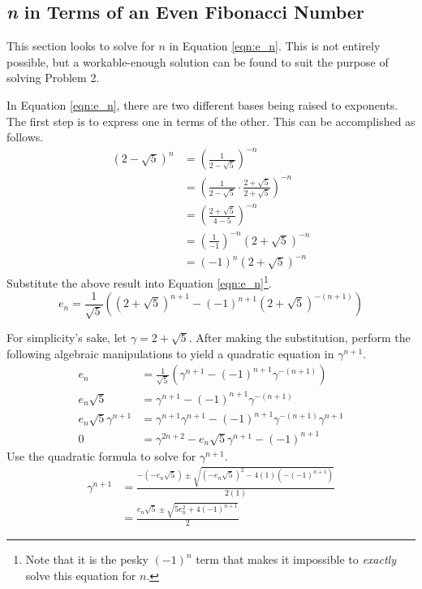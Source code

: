 \documentclass[titlepage]{article}
\begin{document}
\subsection{\emph{n} in Terms of an Even Fibonacci Number}
This section looks to solve for $n$ in Equation \ref{eqn:e_n}. This is not entirely possible, but a workable-enough solution can be found to suit the purpose of solving Problem 2.\par
In Equation \ref{eqn:e_n}, there are two different bases being raised to exponents. The first step is to express one in terms of the other. This can be accomplished as follows.
\begin{align*}
    (2-\sqrt{5})^n &= \left( \frac{1}{2-\sqrt{5}} \right)^{-n}\\
    &= \left( \frac{1}{2-\sqrt{5}}\cdot\frac{2+\sqrt{5}}{2+\sqrt{5}} \right)^{-n}\\
    &= \left( \frac{2+\sqrt{5}}{4-5} \right)^{-n}\\
    &= \left( \frac{1}{-1} \right)^{-n}\left( 2+\sqrt{5} \right)^{-n}\\
    &= (-1)^n\left( 2+\sqrt{5} \right)^{-n}
\end{align*}
Substitute the above result into Equation \ref{eqn:e_n}\footnote{Note that it is the pesky $(-1)^n$ term that makes it impossible to \emph{exactly} solve this equation for $n$.}.
\begin{equation*}
    e_n = \frac{1}{\sqrt{5}}\left( \left( 2+\sqrt{5} \right)^{n+1}-(-1)^{n+1}\left( 2+\sqrt{5} \right)^{-(n+1)} \right)
\end{equation*}\par
For simplicity's sake, let $\gamma=2+\sqrt{5}$. After making the substitution, perform the following algebraic manipulations to yield a quadratic equation in $\gamma^{n+1}$.
\begin{align*}
    e_n &= \frac{1}{\sqrt{5}}\left( \gamma^{n+1}-(-1)^{n+1}\gamma^{-(n+1)} \right)\\
    e_n\sqrt{5} &= \gamma^{n+1}-(-1)^{n+1}\gamma^{-(n+1)}\\
    e_n\sqrt{5}\gamma^{n+1} &= \gamma^{n+1}\gamma^{n+1}-(-1)^{n+1}\gamma^{-(n+1)}\gamma^{n+1}\\
    0 &= \gamma^{2n+2}-e_n\sqrt{5}\gamma^{n+1}-(-1)^{n+1}
\end{align*}
Use the quadratic formula to solve for $\gamma^{n+1}$.
\begin{align*}
    \gamma^{n+1} &= \frac{-(-e_n\sqrt{5})\pm\sqrt{(-e_n\sqrt{5})^2-4(1)(-(-1)^{n+1})}}{2(1)}\\
    &= \frac{e_n\sqrt{5}\pm\sqrt{5e_n^2+4(-1)^{n+1}}}{2}
\end{align*}
\end{document}
